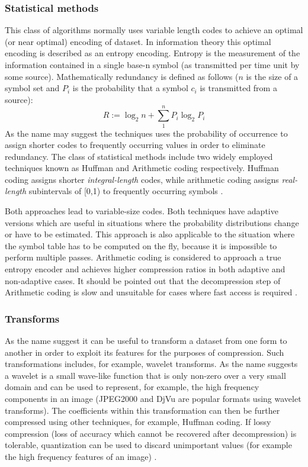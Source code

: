 \documentclass{acm_proc_article-sp}
\begin{document}
\subsubsection{Statistical methods}
This class of algorithms normally uses variable length codes to achieve an optimal (or near optimal) encoding of dataset. In information theory this optimal encoding is 
described as an entropy encoding. Entropy is the measurement of the information contained in a single base-n symbol (as transmitted per time unit by some source). Mathematically
redundancy is defined as follows ($n$ is the size of a symbol set and $P_{i}$ is the probability that a symbol $c_{i}$ is transmitted from a source)\cite[p. 46 - 47]{salomon2004data}:
\begin{equation}
 R := \log_2n + \sum_1^nP_i\log_2P_i
\end{equation}
As the name may suggest the techniques uses the probability of occurrence to assign shorter codes to frequently occurring values in order to eliminate redundancy. The 
class of statistical methods include two widely employed techniques known as Huffman and Arithmetic coding respectively. Huffman coding assigns shorter \textit{integral-length} codes, while arithmetic 
coding assigns \textit{real-length} subintervals of [0,1) to frequently occurring symbols \cite{Witten:1987:ACD:214762.214771}\cite[ch. 2]{salomon2004data}.

Both approaches lead to variable-size codes. Both techniques have adaptive versions which are useful in situations where the probability distributions change or have to be estimated. This 
approach is also applicable to the situation where the symbol table has to be computed on the fly, because it is impossible to perform multiple passes. Arithmetic coding is considered to approach 
a true entropy encoder and achieves higher compression ratios in both adaptive and non-adaptive cases. It should be pointed out that the decompression step of Arithmetic coding is slow and 
unsuitable for cases where fast access is required \cite{ray1995database,williams1999compressing}\cite[ch. 2]{salomon2004data}.

\subsubsection{Transforms}
As the name suggest it can be useful to transform a dataset from one form to another in order to exploit its features for the purposes of compression. Such transformations 
includes, for example, wavelet transforms. As the name suggests a wavelet is a small wave-like function that is only non-zero over a very small domain and can be used 
to represent, for example, the high frequency components in an image (JPEG2000 and DjVu are popular formats using wavelet transforms). The coefficients within this 
transformation can then be further compressed using other techniques, for example, Huffman coding. If lossy compression (loss of accuracy which cannot be recovered after 
decompression)  is tolerable, quantization can be used to discard unimportant values (for example the high frequency features of an image) \cite{952804}\cite[ch. 5]{salomon2004data}.
\end{document}
